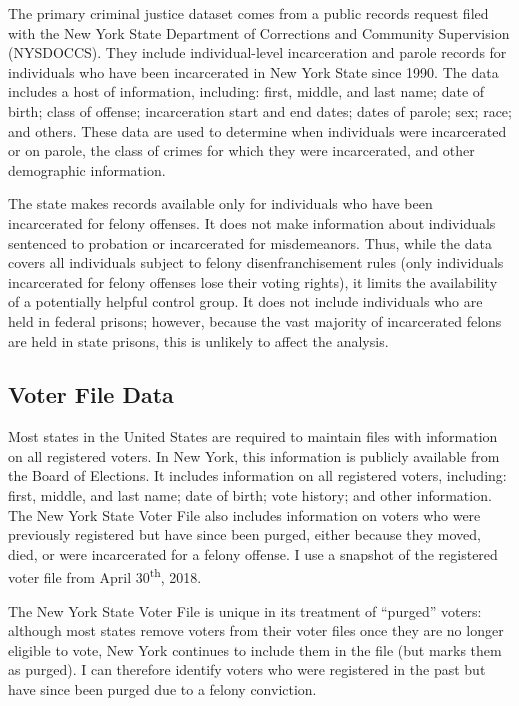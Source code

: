 \documentclass[12pt,]{article}
\begin{document}
The primary criminal justice dataset comes from a public records request filed with the New York State Department of Corrections and Community Supervision (NYSDOCCS). They include individual-level incarceration and parole records for individuals who have been incarcerated in New York State since 1990. The data includes a host of information, including: first, middle, and last name; date of birth; class of offense; incarceration start and end dates; dates of parole; sex; race; and others. These data are used to determine when individuals were incarcerated or on parole, the class of crimes for which they were incarcerated, and other demographic information.

The state makes records available only for individuals who have been incarcerated for felony offenses. It does not make information about individuals sentenced to probation or incarcerated for misdemeanors. Thus, while the data covers all individuals subject to felony disenfranchisement rules (only individuals incarcerated for felony offenses lose their voting rights), it limits the availability of a potentially helpful control group. It does not include individuals who are held in federal prisons; however, because the vast majority of incarcerated felons are held in state prisons, this is unlikely to affect the analysis.

\hypertarget{voter-file-data}{%
\subsection*{Voter File Data}\label{voter-file-data}}

Most states in the United States are required to maintain files with information on all registered voters. In New York, this information is publicly available from the Board of Elections. It includes information on all registered voters, including: first, middle, and last name; date of birth; vote history; and other information. The New York State Voter File also includes information on voters who were previously registered but have since been purged, either because they moved, died, or were incarcerated for a felony offense. I use a snapshot of the registered voter file from April 30\textsuperscript{th}, 2018.

The New York State Voter File is unique in its treatment of ``purged'' voters: although most states remove voters from their voter files once they are no longer eligible to vote, New York continues to include them in the file (but marks them as purged). I can therefore identify voters who were registered in the past but have since been purged due to a felony conviction.
\end{document}
